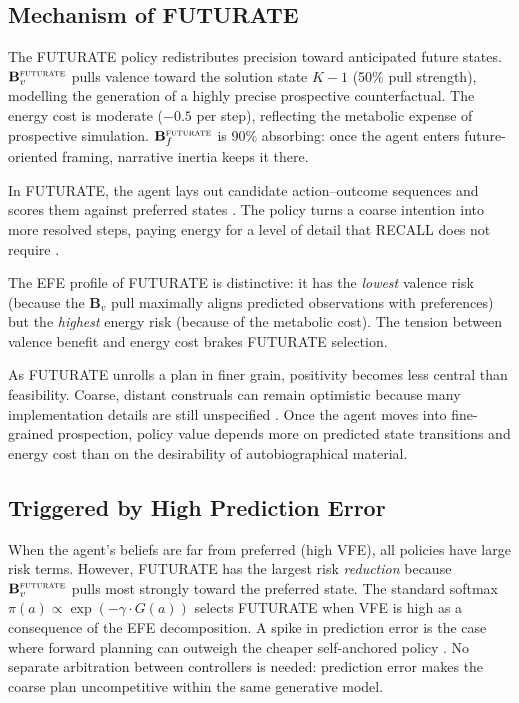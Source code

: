 \documentclass[11pt,a4paper]{article}
\begin{document}
\subsection{Mechanism of FUTURATE}\label{sec:futurate_mechanism}

The FUTURATE policy redistributes precision toward anticipated future states. $\mathbf{B}_v^{\textsc{futurate}}$ pulls valence toward the solution state $K{-}1$ (50\% pull strength), modelling the generation of a highly precise prospective counterfactual. The energy cost is moderate ($-0.5$ per step), reflecting the metabolic expense of prospective simulation. $\mathbf{B}_f^{\textsc{futurate}}$ is 90\% absorbing: once the agent enters future-oriented framing, narrative inertia keeps it there.

In FUTURATE, the agent lays out candidate action--outcome sequences and scores them against preferred states \citep{leiboetal2024}. The policy turns a coarse intention into more resolved steps, paying energy for a level of detail that RECALL does not require \citep{pezzulocisek2016, shenhavbotvinickcohen2013}.

The EFE profile of FUTURATE is distinctive: it has the \emph{lowest} valence risk (because the $\mathbf{B}_v$ pull maximally aligns predicted observations with preferences) but the \emph{highest} energy risk (because of the metabolic cost). The tension between valence benefit and energy cost brakes FUTURATE selection.

As FUTURATE unrolls a plan in finer grain, positivity becomes less central than feasibility. Coarse, distant construals can remain optimistic because many implementation details are still unspecified \citep{tropeliberman2010, sharot2011}. Once the agent moves into fine-grained prospection, policy value depends more on predicted state transitions and energy cost than on the desirability of autobiographical material.

\subsection{Triggered by High Prediction Error}\label{sec:futurate_trigger}

When the agent's beliefs are far from preferred (high VFE), all policies have large risk terms. However, FUTURATE has the largest risk \emph{reduction} because $\mathbf{B}_v^{\textsc{futurate}}$ pulls most strongly toward the preferred state. The standard softmax $\pi(a) \propto \exp(-\gamma \cdot G(a))$ selects FUTURATE when VFE is high as a consequence of the EFE decomposition. A spike in prediction error is the case where forward planning can outweigh the cheaper self-anchored policy \citep{schwabewolf2009, ottoraio2013}. No separate arbitration between controllers is needed: prediction error makes the coarse plan uncompetitive within the same generative model.
\end{document}
